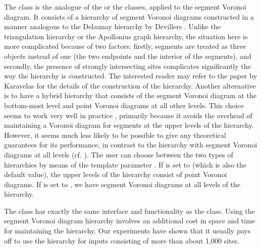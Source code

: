 The
 class is the analogue
of the  or the
 classes, applied to the segment
Voronoi diagram. It consists of a hierarchy of
segment Voronoi diagrams constructed in a manner analogous to the
Delaunay hierarchy by Devillers \cite{cgal:d-dh-02}. Unlike the
triangulation hierarchy or the Apollonius graph hierarchy, the
situation here is more complicated because of two factors: firstly,
segments are treated as three objects instead of one (the two
endpoints and the interior of the segments), and secondly, the
presence of strongly intersecting sites complicates significantly the
way the hierarchy is constructed. The interested reader may refer to
the paper by Karavelas \cite{cgal:k-reisv-04} for the details of the
construction of the hierarchy.
Another alternative is to have a hybrid hierarchy that consists of the
segment Voronoi diagram at the bottom-most level and point Voronoi
diagrams at all other levels. This choice seems to work very well in
practice , primarily because it avoids the overhead of maintaining a
Voronoi diagram for segments at the upper levels of the
hierarchy. However, it seems much less likely to be possible to give
any theoretical guarantees for its performance, in contrast to the
hierarchy with segment Voronoi diagrams at all levels
(cf. \cite{cgal:k-reisv-04}). The user can choose between the two
types of hierarchies by means of the template parameter
. If  is set to  (which is also the
default value), the upper levels of the hierarchy consist of point
Voronoi diagrams. If  is set to , we have segment
Voronoi diagrams at all levels of the hierarchy.

The class
has exactly the same interface and functionality as the
class. Using the segment Voronoi diagram hierarchy involves an
additional cost in space and time for maintaining the hierarchy. Our
experiments have shown that it usually pays off to use the hierarchy
for inputs consisting of more than about 1,000 sites. 


